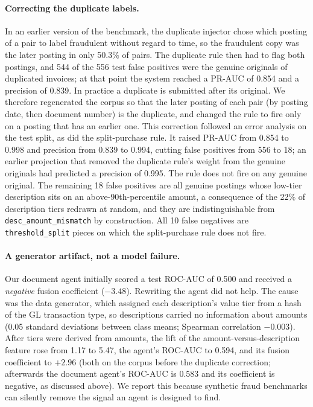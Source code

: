 \documentclass{article}
\newcommand{\typ}[1]{\texttt{#1}}
\begin{document}
\paragraph{Correcting the duplicate labels.} In an earlier version of the benchmark, the duplicate injector chose which posting of a pair to label fraudulent without regard to time, so the fraudulent copy was the later posting in only 50.3\% of pairs. The duplicate rule then had to flag both postings, and 544 of the 556 test false positives were the genuine originals of duplicated invoices; at that point the system reached a PR-AUC of 0.854 and a precision of 0.839. In practice a duplicate is submitted after its original. We therefore regenerated the corpus so that the later posting of each pair (by posting date, then document number) is the duplicate, and changed the rule to fire only on a posting that has an earlier one. This correction followed an error analysis on the test split, as did the split-purchase rule. It raised PR-AUC from 0.854 to 0.998 and precision from 0.839 to 0.994, cutting false positives from 556 to 18; an earlier projection that removed the duplicate rule's weight from the genuine originals had predicted a precision of 0.995. The rule does not fire on any genuine original. The remaining 18 false positives are all genuine postings whose low-tier description sits on an above-90th-percentile amount, a consequence of the 22\% of description tiers redrawn at random, and they are indistinguishable from \typ{desc\_amount\_mismatch} by construction. All 10 false negatives are \typ{threshold\_split} pieces on which the split-purchase rule does not fire.

\paragraph{A generator artifact, not a model failure.} Our document agent initially scored a test ROC-AUC of 0.500 and received a \emph{negative} fusion coefficient ($-3.48$). Rewriting the agent did not help. The cause was the data generator, which assigned each description's value tier from a hash of the GL transaction type, so descriptions carried no information about amounts (0.05 standard deviations between class means; Spearman correlation $-0.003$). After tiers were derived from amounts, the lift of the amount-versus-description feature rose from 1.17 to 5.47, the agent's ROC-AUC to 0.594, and its fusion coefficient to $+2.96$ (both on the corpus before the duplicate correction; afterwards the document agent's ROC-AUC is 0.583 and its coefficient is negative, as discussed above). We report this because synthetic fraud benchmarks can silently remove the signal an agent is designed to find.
\end{document}
